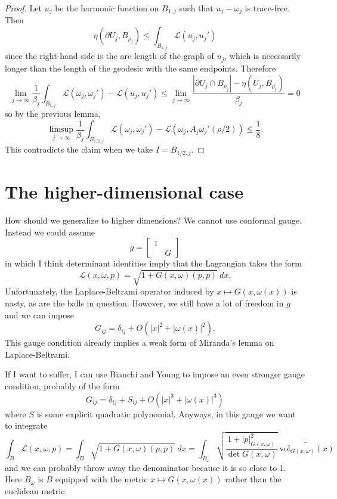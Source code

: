 \documentclass[reqno,12pt,letterpaper]{amsart}
\newcommand{\vol}{\mathrm{vol}}
\theoremstyle{definition}
\numberwithin{equation}{section}
\begin{document}
\begin{proof}
Let $u_j$ be the harmonic function on $B_{1, j}$ such that $u_j - \omega_j$ is trace-free. Then
$$\eta(\partial U_j, B_{\rho_j}) \leq \int_{B_{1, j}} \mathscr L(u_j, u_j')$$
since the right-hand side is the arc length of the graph of $u_j$, which is necessarily longer than the length of the geodesic with the same endpoints.
Therefore
$$\lim_{j \to \infty} \frac{1}{\beta_j} \int_{B_{1, j}} \mathscr L(\omega_j, \omega_j') - \mathscr L(u_j, u_j') \leq \lim_{j \to \infty} \frac{|\partial U_j \cap B_{\rho_j}| - \eta(U_j, B_{\rho_j})}{\beta_j} = 0$$
so by the previous lemma,
$$\limsup_{j \to \infty} \frac{1}{\beta_j} \int_{B_{1/2,j}} \mathscr L(\omega_j, \omega_j') - \mathscr L(\omega_j, A_j \omega_j'(\rho/2)) \leq \frac{1}{8}.$$
This contradicts the claim when we take $I = B_{1/2,j}$.
\end{proof}




\section{The higher-dimensional case}
How should we generalize to higher dimensions?
We cannot use conformal gauge. Instead we could assume
$$g = \begin{bmatrix}1 \\ & G\end{bmatrix}$$
in which I think determinant identities imply that the Lagrangian takes the form
$$\mathscr L(x, \omega, p) = \sqrt{1 + G(x, \omega)(p, p)} ~dx.$$
Unfortunately, the Laplace-Beltrami operator induced by $x \mapsto G(x, \omega(x))$ is nasty, as are the balls in question.
However, we still have a lot of freedom in $g$ and we can impose
$$G_{ij} = \delta_{ij} + O(|x|^2 + |\omega(x)|^2).$$
This gauge condition already implies a weak form of Miranda's lemma on Laplace-Beltrami.

If I want to suffer, I can use Bianchi and Young to impose an even stronger gauge condition, probably of the form
$$G_{ij} = \delta_{ij} + S_{ij} + O(|x|^3 + |\omega(x)|^3)$$
where $S$ is some explicit quadratic polynomial.
Anyways, in this gauge we want to integrate
$$\int_B \mathscr L(x, \omega, p) = \int_B \sqrt{1 + G(x, \omega)(p, p)} ~dx = \int_{B_\omega} \sqrt{\frac{1 + |p|_{G(x, \omega)}^2}{\det G(x, \omega)}} ~\widetilde{\vol_{G(x, \omega)}(x)}$$
and we can probably throw away the denominator because it is so close to $1$.
Here $B_\omega$ is $B$ equipped with the metric $x \mapsto G(x, \omega(x))$ rather than the euclidean metric.

\printbibliography
\end{document}
